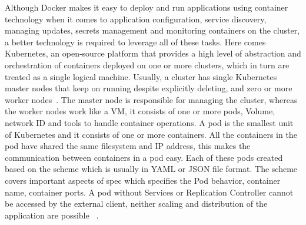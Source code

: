 Although Docker makes it easy to deploy and run applications using
container technology when it comes to application configuration,
service discovery, managing updates, secrets management and monitoring
containers on the cluster, a better technology is required to leverage
all of these tasks. Here comes Kubernetes, an open-source platform
that provides a high level of abstraction and orchestration of
containers deployed on one or more clusters, which in turn are treated
as a single logical machine. Usually, a cluster has single Kubernetes
master nodes that keep on running despite explicitly deleting, and
zero or more worker nodes~\cite{hid-sp18-602-kubernetes}. The
master node is responsible for managing the cluster, whereas the
worker nodes work like a VM, it consists of one or more pods, Volume,
network ID and tools to handle container operations. A pod is the
smallest unit of Kubernetes and it consists of one or more
containers. All the containers in the pod have shared the same
filesystem and IP address, this makes the communication between
containers in a pod easy. Each of these pods created based on the
scheme which is usually in YAML or JSON file format. The scheme covers
important aspects of spec which specifies the Pod behavior, container
name, container ports. A pod without Services or Replication
Controller cannot be accessed by the external client, neither scaling
and distribution of the application are possible
~\cite{hid-sp18-602-pods}.

